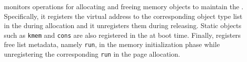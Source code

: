 {\sysname} monitors operations for allocating and freeing memory objects to maintain the {\alist}. Specifically, it registers the virtual address to the corresponding object type list in the {\alist} during allocation and it unregisters them during releasing. Static objects such as \texttt{kmem} and \texttt{cons} are also registered in the {\alist} at boot time. Finally, {\sysname} registers free list metadata, namely \texttt{run}, in the memory initialization phase while unregistering the corresponding \texttt{run} in the page allocation.



